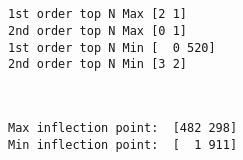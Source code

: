 \documentclass[11pt]{article}
\begin{document}
    \begin{center}
    \end{center}
    { \hspace*{\fill} \\}
    
    \begin{center}
    \end{center}
    { \hspace*{\fill} \\}
    
    \begin{Verbatim}[commandchars=\\\{\}]
1st order top N Max [2 1]
2nd order top N Max [0 1]
1st order top N Min [  0 520]
2nd order top N Min [3 2]

    \end{Verbatim}

    \begin{center}
    \end{center}
    { \hspace*{\fill} \\}
    
    \begin{Verbatim}[commandchars=\\\{\}]
Max inflection point:  [482 298]
Min inflection point:  [  1 911]

    \end{Verbatim}

    \begin{center}
    \end{center}
    { \hspace*{\fill} \\}
    
    \begin{center}
    \end{center}
    { \hspace*{\fill} \\}
    
    \begin{center}
    \end{center}
    { \hspace*{\fill} \\}
    
\end{document}
